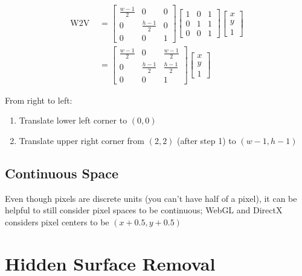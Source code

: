   \begin{align}
    \text{W2V } &=
    \begin{bmatrix}
      \frac{w - 1}{2} & 0 & 0 \\
      0 & \frac{h - 1}{2} & 0 \\
      0 & 0 & 1
    \end{bmatrix}
    \begin{bmatrix}
      1 & 0 & 1 \\
      0 & 1 & 1 \\
      0 & 0 & 1
    \end{bmatrix}
    \begin{bmatrix}
      x \\
      y \\
      1
    \end{bmatrix} \\
    &=
    \begin{bmatrix}
      \frac{w - 1}{2} & 0 & \frac{w - 1}{2} \\
      0 & \frac{h - 1}{2} & \frac{h - 1}{2} \\
      0 & 0 & 1
    \end{bmatrix}
    \begin{bmatrix}
      x \\
      y \\
      1
    \end{bmatrix}
  \end{align}

  From right to left:

  \begin{enumerate}
    \item Translate lower left corner to $ \left( 0, 0 \right) $
    \item Translate upper right corner from $ \left( 2, 2 \right) $ (after step
    1) to $ \left( w - 1, h - 1 \right) $
  \end{enumerate}

  \subsection{Continuous Space}

    Even though pixels are discrete units (you can't have half of a pixel),
    it can be helpful to still consider pixel spaces to be continuous; WebGL
    and DirectX considers pixel centers to be
    $ \left( x + 0.5, y + 0.5 \right) $

\section{Hidden Surface Removal}

